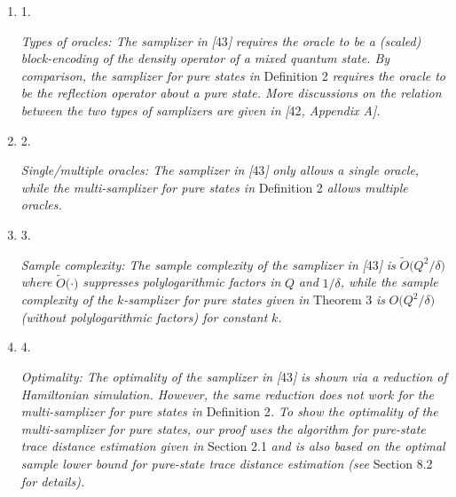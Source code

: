 \begin{enumerate}


\item[] 
1. 


\emph{Types of oracles: The samplizer in }\emph{[}43\emph{]}\emph{ requires the oracle to be a (scaled) block-encoding of the density operator of a mixed quantum state. By comparison, the samplizer for pure states in }Definition 2\emph{ requires the oracle to be the reflection operator about a pure state. More discussions on the relation between the two types of samplizers are given in }\emph{[}42\emph{, Appendix A]}\emph{.}\par





\item[] 
2. 


\emph{Single/multiple oracles: The samplizer in }\emph{[}43\emph{]}\emph{ only allows a single oracle, while the multi-samplizer for pure states in }Definition 2\emph{ allows multiple oracles.}\par





\item[] 
3. 


\emph{Sample complexity: The sample complexity of the samplizer in }\emph{[}43\emph{]}\emph{ is }$\widetilde{O}\lparen Q^{2}/\delta\rparen$\emph{ where }$\widetilde{O}\lparen\cdot\rparen$\emph{ suppresses polylogarithmic factors in }$Q$\emph{ and }$1/\delta$\emph{, while the sample complexity of the }$k$\emph{-samplizer for pure states given in }Theorem 3\emph{ is }$O\lparen Q^{2}/\delta\rparen$\emph{ (without polylogarithmic factors) for constant }$k$\emph{.}\par





\item[] 
4. 


\emph{Optimality: The optimality of the samplizer in }\emph{[}43\emph{]}\emph{ is shown via a reduction of Hamiltonian simulation.
However, the same reduction does not work for the multi-samplizer for pure states in }Definition 2\emph{.
To show the optimality of the multi-samplizer for pure states, our proof uses the algorithm for pure-state trace distance estimation given in }Section 2.1\emph{ and is also based on the optimal sample lower bound for pure-state trace distance estimation (see }Section 8.2\emph{ for details).}\par





\end{enumerate}



